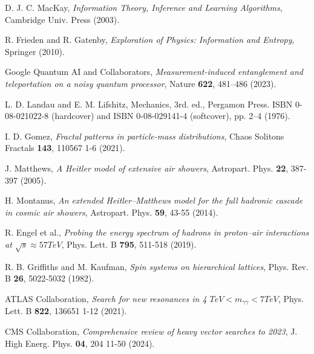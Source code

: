 \documentclass[%
 amsmath,amssymb,
 aps,
prb,
floatfix, showkeys
]{revtex4-2}
\begin{document}
\begin{thebibliography}{99}
  D. J. C. MacKay, {\it Information Theory, Inference and Learning Algorithms}, Cambridge Univ. Press (2003).

  R. Frieden and R. Gatenby, {\it Exploration of Physics: Information and Entropy}, Springer (2010).
  
  Google Quantum AI and Collaborators,
  {\it  Measurement-induced entanglement and teleportation on a noisy quantum processor},
  Nature {\bf 622}, 481–486 (2023).  %

  L. D. Landau and E. M. Lifshitz,  Mechanics, 3rd. ed., Pergamon Press.
  ISBN 0-08-021022-8 (hardcover) and ISBN 0-08-029141-4 (softcover), pp. 2–4 (1976).
  
  I. D. Gomez, {\it Fractal patterns in particle‐mass distributions},
  Chaos Solitons Fractals {\bf 143}, 110567 1-6 (2021).

  J. Matthews, {\it A Heitler model of extensive air showers}, Astropart. Phys.
  {\bf 22},  387-397 (2005).

  H. Montanus, {\it An extended Heitler–Matthews model for the full hadronic cascade in cosmic air showers},
  Astropart. Phys. {\bf 59},  43-55 (2014).
  
  R. Engel et al., {\it Probing the energy spectrum of hadrons in proton–air interactions at
    $\sqrt{s} \approx 57 TeV$},  Phys. Lett. B {\bf 795},  511-518 (2019).

  R. B. Griffiths and M. Kaufman, {\it Spin systems on hierarchical lattices},
  Phys. Rev. B {\bf 26}, 5022-5032 (1982).

  ATLAS Collaboration, {\it Search for new resonances in 4 $TeV < m_{\gamma \gamma} < 7 TeV$},
  Phys. Lett. B  {\bf 822},  136651 1-12 (2021).

  CMS Collaboration, {\it Comprehensive review of heavy vector searches to 2023},
   J. High Energ. Phys. {\bf 04}, 204 11-50 (2024).
  

\end{thebibliography}
\end{document}

